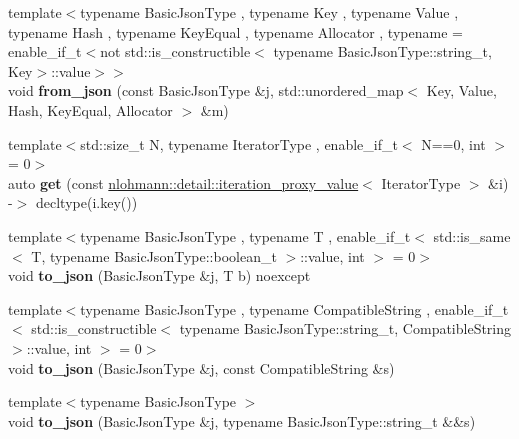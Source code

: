 \begin{DoxyCompactItemize}
\item 
\mbox{\label{namespacenlohmann_1_1detail_aef5c8ea108f4d2b03fb4a635617510de}} 
{\footnotesize template$<$typename Basic\+Json\+Type , typename Key , typename Value , typename Hash , typename Key\+Equal , typename Allocator , typename  = enable\+\_\+if\+\_\+t$<$not std\+::is\+\_\+constructible$<$			typename Basic\+Json\+Type\+::string\+\_\+t, Key$>$\+::value$>$$>$ }\\void {\bfseries from\+\_\+json} (const Basic\+Json\+Type \&j, std\+::unordered\+\_\+map$<$ Key, Value, Hash, Key\+Equal, Allocator $>$ \&m)
\item 
\mbox{\label{namespacenlohmann_1_1detail_acc422c11342b31368f610b6f96fcedc6}} 
{\footnotesize template$<$std\+::size\+\_\+t N, typename Iterator\+Type , enable\+\_\+if\+\_\+t$<$ N==0, int $>$  = 0$>$ }\\auto {\bfseries get} (const \hyperlink{classnlohmann_1_1detail_1_1iteration__proxy__value}{nlohmann\+::detail\+::iteration\+\_\+proxy\+\_\+value}$<$ Iterator\+Type $>$ \&i) -\/$>$ decltype(i.\+key())
\item 
\mbox{\label{namespacenlohmann_1_1detail_a1a804b98cbe89b7e44b698f2ca860490}} 
{\footnotesize template$<$typename Basic\+Json\+Type , typename T , enable\+\_\+if\+\_\+t$<$ std\+::is\+\_\+same$<$ T, typename Basic\+Json\+Type\+::boolean\+\_\+t $>$\+::value, int $>$  = 0$>$ }\\void {\bfseries to\+\_\+json} (Basic\+Json\+Type \&j, T b) noexcept
\item 
\mbox{\label{namespacenlohmann_1_1detail_a7356ed05cdbbb080cee80e1211e1c6c9}} 
{\footnotesize template$<$typename Basic\+Json\+Type , typename Compatible\+String , enable\+\_\+if\+\_\+t$<$ std\+::is\+\_\+constructible$<$ typename Basic\+Json\+Type\+::string\+\_\+t, Compatible\+String $>$\+::value, int $>$  = 0$>$ }\\void {\bfseries to\+\_\+json} (Basic\+Json\+Type \&j, const Compatible\+String \&s)
\item 
\mbox{\label{namespacenlohmann_1_1detail_a4aa1ca6b7c61bf19d1f30ea5b669f68e}} 
{\footnotesize template$<$typename Basic\+Json\+Type $>$ }\\void {\bfseries to\+\_\+json} (Basic\+Json\+Type \&j, typename Basic\+Json\+Type\+::string\+\_\+t \&\&s)

\end{DoxyCompactItemize}
